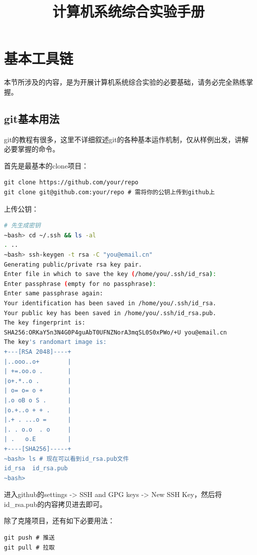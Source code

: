 \documentclass[lang=cn,11pt,a4paper]{elegantpaper}
\title{计算机系统综合实验手册}
\begin{document}
\maketitle

\tableofcontents

\newpage

\section{基本工具链}

本节所涉及的内容，是为开展计算机系统综合实验的必要基础，请务必完全熟练掌握。

\subsection{git基本用法}

git的教程有很多，这里不详细叙述git的各种基本运作机制，仅从样例出发，讲解必要掌握的命令。

首先是最基本的clone项目：
\begin{lstlisting}
git clone https://github.com/your/repo
git clone git@github.com:your/repo # 需将你的公钥上传到github上
\end{lstlisting}

上传公钥：
\begin{lstlisting}[language=bash]
# 先生成密钥
~bash> cd ~/.ssh && ls -al
. ..
~bash> ssh-keygen -t rsa -C "you@email.cn"
Generating public/private rsa key pair.
Enter file in which to save the key (/home/you/.ssh/id_rsa):
Enter passphrase (empty for no passphrase): 
Enter same passphrase again: 
Your identification has been saved in /home/you/.ssh/id_rsa.
Your public key has been saved in /home/you/.ssh/id_rsa.pub.
The key fingerprint is:
SHA256:ORKaY5n3N4G0P4guAbT0UFNZNorA3mqSL0S0xPWo/+U you@email.cn
The key's randomart image is:
+---[RSA 2048]----+
|..ooo..o+        |
| +=.oo.o .       |
|o+.*..o .        |
| o= o= o +       |
|.o oB o S .      |
|o.+..o + + .     |
|.+ . ...o =      |
|. . o.o  . o     |
| .   o.E         |
+----[SHA256]-----+
~bash> ls # 现在可以看到id_rsa.pub文件
id_rsa  id_rsa.pub
~bash>
\end{lstlisting}
进入github的settings -> SSH and GPG keys -> New SSH Key，然后将id\_rsa.pub的内容拷贝进去即可。

除了克隆项目，还有如下必要用法：
\begin{lstlisting}
git push # 推送
git pull # 拉取
\end{lstlisting}
\end{document}
